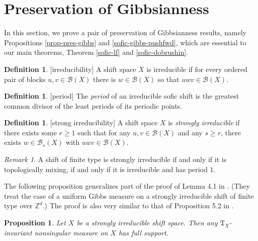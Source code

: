 \documentclass{amsproc}
\numberwithin{theorem}{section}
\newtheorem{proposition}[theorem]{Proposition}
\theoremstyle{remark}
\newtheorem*{remark}{Remark}
\theoremstyle{definition}
\newtheorem{defn}[theorem]{Definition}
\newcommand{\cB}{\mathcal{B}}
\newcommand{\fT}{\mathfrak{T}}
\newcommand{\Z}{\mathbb{Z}}
\theoremstyle{plain}
\begin{document}
\section{Preservation of Gibbsianness}\label{pres-gibbs-sec}

In this section, we prove a pair of preservation of Gibbsianness results, namely Propositions \ref{prop-pres-gibbs} and \ref{sofic-gibbs-pushfwd}, which are essential to our main theorems, Theorem \ref{sofic-lf} and \ref{sofic-dobrushin}. 

\begin{defn}\label{defn-irred-z} [irreducibility]
A shift space $X$ is irreducible if for every ordered pair of blocks $u, v \in \cB(X)$ there is $w \in \cB(X)$ so that $uwv \in \cB(X)$.
\end{defn}

\begin{defn}\label{defn-aper}[period]
The \textit{period} of an irreducible sofic shift is the greatest common divisor of the least periods of its periodic points.
\end{defn}

\begin{defn}\label{strong-irred-defn}[strong irreducibility]
A shift space $X$ is \textit{strongly irreducible} if there exists some $r \geq 1$ such that for any $u,v \in \cB(X)$ and any $s \geq r$, there exists $w \in \cB_s(X)$ with $uwv \in \cB(X)$.
\end{defn}

\begin{remark}
A shift of finite type is strongly irreducible if and only if it is topologically mixing, if and only if it is irreducible and has period $1$.
\end{remark}

The following proposition generalizes part of the proof of Lemma 4.1 in \cite{meester-steif-2001-higher-dim}. (They treat the case of a uniform Gibbs measure on a strongly irreducible shift of finite type over $\Z^d$.) The proof is also very similar to that of Proposition 5.2 in \cite{marcus-pavlov-2013-approx}.


\begin{proposition}\label{strong-irred-support}
Let $X$ be a strongly irreducible shift space. Then any $\fT_X$-invariant nonsingular measure on $X$ has full support.
\end{proposition}
\end{document}
